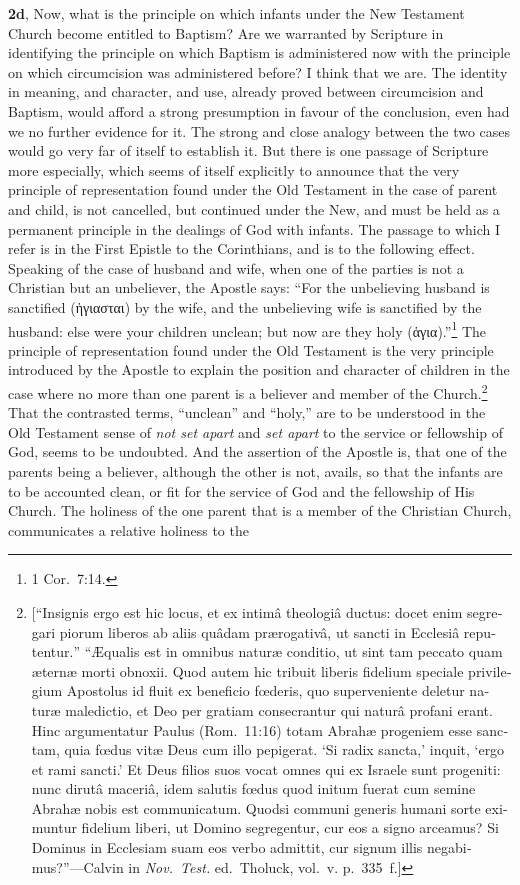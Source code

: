 \documentclass[
]{book}
\begin{document}
\textbf{2d}, Now, what is the principle on which infants under the New Testament Church become entitled to Baptism? Are we warranted by Scripture in identifying the principle on which Baptism is administered now with the principle on which circumcision was administered before? I think that we are. The identity in meaning, and character, and use, already proved between circumcision and Baptism, would afford a strong presumption in favour of the conclusion, even had we no further evidence for it. The strong and close analogy between the two cases would go very far of itself to establish it. But there is one passage of Scripture more especially, which seems of itself explicitly to announce that the very principle of representation found under the Old Testament in the case of parent and child, is not cancelled, but continued under the New, and must be held as a permanent principle in the dealings of God with infants. The passage to which I refer is in the First Epistle to the Corinthians, and is to the following effect. Speaking of the case of husband and wife, when one of the parties is not a Christian but an unbeliever, the Apostle says: ``For the unbelieving husband is sanctified (\foreignlanguage{greek}{ἡγιασται}) by the wife, and the unbelieving wife is sanctified by the husband: else were your children unclean; but now are they holy (\foreignlanguage{greek}{ἁγια}).''\footnote{1 Cor.~7:14.} The principle of representation found under the Old Testament is the very principle introduced by the Apostle to explain the position and character of children in the case where no more than one parent is a believer and member of the Church.\footnote{{[}``\foreignlanguage{latin}{Insignis ergo est hic locus, et ex intimâ theologiâ ductus: docet enim segregari piorum liberos ab aliis quâdam prærogativâ, ut sancti in Ecclesiâ reputentur.}'' ``\foreignlanguage{latin}{Æqualis est in omnibus naturæ conditio, ut sint tam peccato quam æternæ morti obnoxii. Quod autem hic tribuit liberis fidelium speciale privilegium Apostolus id fluit ex beneficio fœderis, quo superveniente deletur naturæ maledictio, et Deo per gratiam consecrantur qui naturâ profani erant. Hinc argumentatur Paulus} (Rom.~11:16) \foreignlanguage{latin}{totam Abrahæ progeniem esse sanctam, quia fœdus vitæ Deus cum illo pepigerat. `Si radix sancta,' inquit, `ergo et rami sancti.' Et Deus filios suos vocat omnes qui ex Israele sunt progeniti: nunc dirutâ maceriâ, idem salutis fœdus quod initum fuerat cum semine Abrahæ nobis est communicatum. Quodsi communi generis humani sorte eximuntur fidelium liberi, ut Domino segregentur, cur eos a signo arceamus? Si Dominus in Ecclesiam suam eos verbo admittit, cur signum illis negabimus?}''---Calvin in \emph{Nov.~Test.} ed.~Tholuck, vol.~v. p.~335~f.{]}} That the contrasted terms, ``unclean'' and ``holy,'' are to be understood in the Old Testament sense of \emph{not set apart} and \emph{set apart} to the service or fellowship of God, seems to be undoubted. And the assertion of the Apostle is, that one of the parents being a believer, although the other is not, avails, so that the infants are to be accounted clean, or fit for the service of God and the fellowship of His Church. The holiness of the one parent that is a member of the Christian Church, communicates a relative holiness to the 
\end{document}
